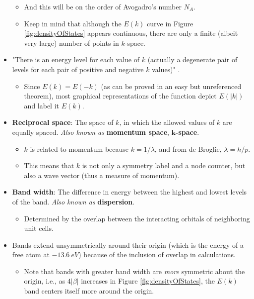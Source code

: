 \documentclass[../notes.tex]{subfiles}
\begin{document}
\begin{itemize}
    \begin{itemize}
        \item And this will be on the order of Avogadro's number $N_A$.
        \item Keep in mind that although the $E(k)$ curve in Figure \ref{fig:densityOfStates} appears continuous, there are only a finite (albeit very large) number of points in $k$-space.
    \end{itemize}
    \item "There is an energy level for each value of $k$ (actually a degenerate pair of levels for each pair of positive and negative $k$ values)" \parencite[848]{bib:bandTheory}.
    \begin{itemize}
        \item Since $E(k)=E(-k)$ (as can be proved in an easy but unreferenced theorem), most graphical representations of the function depict $E(|k|)$ and label it $E(k)$.
    \end{itemize}
    \item \textbf{Reciprocal space}: The space of $k$, in which the allowed values of $k$ are equally spaced. \emph{Also known as} \textbf{momentum space}, \textbf{$\bm{k}$-space}.
    \begin{itemize}
        \item $k$ is related to momentum because $k=1/\lambda$, and from de Broglie, $\lambda=h/p$.
        \item This means that $k$ is not only a symmetry label and a node counter, but also a wave vector (thus a measure of momentum).
    \end{itemize}
    \item \textbf{Band width}: The difference in energy between the highest and lowest levels of the band. \emph{Also known as} \textbf{dispersion}.
    \begin{itemize}
        \item Determined by the overlap between the interacting orbitals of neighboring unit cells.
    \end{itemize}
    \item Bands extend unsymmetrically around their origin (which is the energy of a free  atom at $\SI{-13.6}{eV}$) because of the inclusion of overlap in calculations.
    \begin{itemize}
        \item Note that bands with greater band width are \emph{more} symmetric about the origin, i.e., as $4|\beta|$ increases in Figure \ref{fig:densityOfStates}, the $E(k)$ band centers itself more around the origin.

\end{itemize}
\end{itemize}
\end{document}
